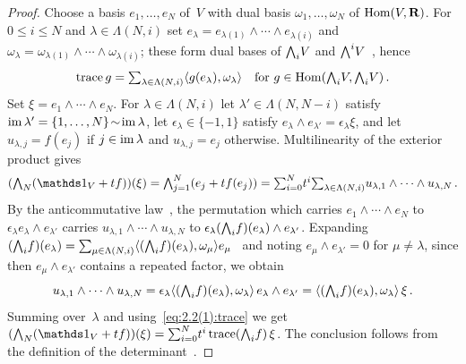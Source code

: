 \begin{proof}
    Choose a basis $e_1, \ldots, e_N$ of~$V$ with dual basis $\omega_1, \ldots, \omega_N$ of
    $\operatorname{Hom}(V,\mathbf{R})$. For $0 \le i \le N$ and $\lambda \in \Lambda(N,i)$ set $e_\lambda =
    e_{\lambda(1)} \wedge \cdots \wedge e_{\lambda(i)}$ and $\omega_\lambda = \omega_{\lambda(1)}
    \wedge \cdots \wedge \omega_{\lambda(i)}$; these form dual bases of ${\textstyle\boldsymbol{\bigwedge}}_{{i}} V$ and
    ${\textstyle\boldsymbol{\bigwedge}}_{{}}^i V$~\cite[1.4.3]{Federer1969}, hence
    \begin{equation}
        \label{eq:2.2(1):trace}
        \operatorname{trace} g = {\textstyle\sum_{\lambda \in \Lambda(N,i)}^{}} \langle g(e_\lambda), \omega_\lambda
        \rangle \quad \text{for $g \in \operatorname{Hom}({\textstyle\boldsymbol{\bigwedge}}_{{i}} V, {\textstyle\boldsymbol{\bigwedge}}_{{i}} V)$} \,.
    \end{equation}
    Set $\xi = e_1 \wedge \cdots \wedge e_N$. For $\lambda \in \Lambda(N,i)$ let $\lambda' \in
    \Lambda(N,N-i)$ satisfy $\operatorname{im} \lambda' = \{1, \ldots, N\} \!\sim\! \operatorname{im} \lambda$, let
    $\epsilon_\lambda \in \{-1,1\}$ satisfy $e_\lambda \wedge e_{\lambda'} = \epsilon_\lambda
    \xi$, and let $u_{\lambda,j} = f(e_j)$ if $j \in \operatorname{im} \lambda$ and $u_{\lambda,j} = e_j$
    otherwise. Multilinearity of the exterior product gives
    \begin{displaymath}
        (\extpower{N} (\id{V} + t f))(\xi) = \textstyle\bigwedge_{j=1}^N (e_j + t f(e_j)) =
        \textsum{i=0}{N} t^i \textsum{\lambda \in \Lambda(N,i)}{} u_{\lambda,1} \wedge \cdots
        \wedge u_{\lambda,N} \,.
    \end{displaymath}
    By the anticommutative law~\cite[1.3.1]{Federer1969}, the permutation which carries $e_1
    \wedge \cdots \wedge e_N$ to $\epsilon_\lambda e_\lambda \wedge e_{\lambda'}$ carries
    $u_{\lambda,1} \wedge \cdots \wedge u_{\lambda,N}$ to $\epsilon_\lambda
    ({\textstyle\boldsymbol{\bigwedge}}_{{i}} f)(e_\lambda) \wedge e_{\lambda'}$. Expanding $({\textstyle\boldsymbol{\bigwedge}}_{{i}} f)(e_\lambda) =
    {\textstyle\sum_{\mu \in \Lambda(N,i)}^{}} \langle ({\textstyle\boldsymbol{\bigwedge}}_{{i}} f)(e_\lambda), \omega_\mu \rangle
    e_\mu$~\cite[1.4.3]{Federer1969} and noting $e_\mu \wedge e_{\lambda'} = 0$ for $\mu \ne
    \lambda$, since then $e_\mu \wedge e_{\lambda'}$ contains a repeated factor, we obtain
    \begin{displaymath}
        u_{\lambda,1} \wedge \cdots \wedge u_{\lambda,N} = \epsilon_\lambda \langle
        ({\textstyle\boldsymbol{\bigwedge}}_{{i}} f)(e_\lambda), \omega_\lambda \rangle \, e_\lambda \wedge e_{\lambda'} =
        \langle ({\textstyle\boldsymbol{\bigwedge}}_{{i}} f)(e_\lambda), \omega_\lambda \rangle \, \xi \,.
    \end{displaymath}
    Summing over~$\lambda$ and using~\eqref{eq:2.2(1):trace} we get $(\extpower{N} (\id{V} + t
    f))(\xi) = \textsum{i=0}{N} t^i \trace(\extpower{i} f) \, \xi$. The conclusion follows from
    the definition of the determinant~\cite[1.3.4]{Federer1969}.
\end{proof}

